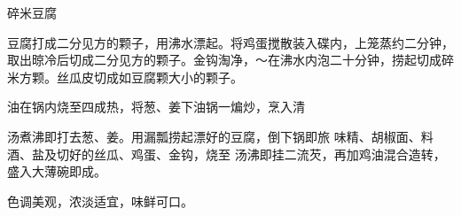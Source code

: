 \begin{recipe}{碎米豆腐}

\ingredients


\cooking

\step 豆腐打成二分见方的颗子，用沸水漂起。将鸡蛋搅散装入碟内，上笼蒸约二分钟，取出晾冷后切成二分见方的颗子。金钩淘净，〜在沸水内泡二十分钟，捞起切成碎米方颗。丝瓜皮切成如豆腐颗大小的颗子。

\step 油在锅内烧至四成热，将葱、姜下油锅一煸炒，烹入清

汤煮沸即打去葱、姜。用漏瓢捞起漂好的豆腐，倒下锅即旅 味精、胡椒面、料酒、盐及切好的丝瓜、鸡蛋、金钩，烧至 汤沸即挂二流芡，再加鸡油混合造转，盛入大薄碗即成。

\notes

色调美观，浓淡适宜，味鲜可口。

\end{recipe}

